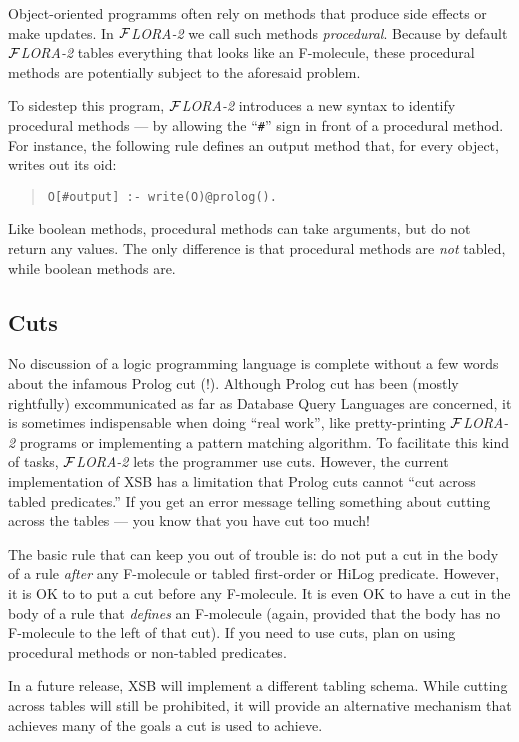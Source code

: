 \documentclass[11pt]{article}
\newcommand{\FLORA}{{\mbox{${\cal F}${\small\it LORA}\rm\emph{-2}}}\xspace}
\begin{document}
Object-oriented programms often rely on methods that produce side effects
or make updates.  In \FLORA we call such methods \emph{procedural}.
Because by default \FLORA tables everything that looks like an F-molecule,
these procedural methods are potentially subject to the aforesaid problem.

To sidestep this program, \FLORA introduces a new syntax to identify
procedural methods --- by allowing the ``\verb|#|'' sign in front of a
procedural method. For instance, the following rule defines an output
method that, for every object, writes out its oid:
\begin{quote}
\verb|O[#output] :- write(O)@prolog().|
\end{quote}
Like boolean methods, procedural methods can take arguments, but do not
return any values.  The only difference is that procedural methods are
\emph{not} tabled, while boolean methods are.


\subsection{Cuts}


\index{cuts in \FLORA}
No discussion of a logic programming language is complete without a few
words about the infamous Prolog cut (!). Although Prolog cut has been
(mostly rightfully) excommunicated as far as Database Query Languages are
concerned, it is sometimes indispensable when doing ``real work'', like
pretty-printing \FLORA programs or implementing a pattern matching
algorithm.  To facilitate this kind of tasks, \FLORA lets the programmer
use cuts.  However, the current implementation of XSB has a limitation that
Prolog cuts cannot ``cut across tabled predicates.''  If you get an error
message telling something about cutting across the tables --- you know that
you have cut too much!

The basic rule that can keep you out of trouble is: do not put a cut in the
body of a rule \emph{after} any F-molecule or tabled first-order or HiLog
predicate. However, it is OK to to put a cut before any F-molecule. It is
even OK to have a cut in the body of a rule that \emph{defines} an
F-molecule (again, provided that the body has no F-molecule to the left of
that cut). If you need to use cuts, plan on using procedural methods or
non-tabled predicates.

In a future release, XSB will implement a different tabling schema. While
cutting across tables will still be prohibited, it will provide an
alternative mechanism that achieves many of the goals a cut is used to
achieve.
\end{document}
